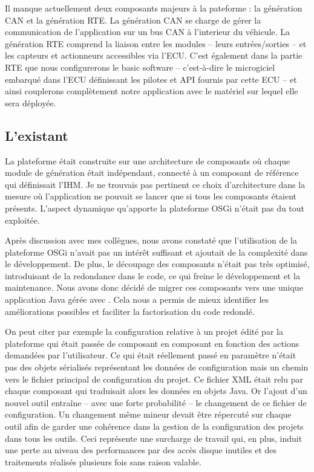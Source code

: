 Il manque actuellement deux composants majeurs à la pateforme : la génération
CAN et la génération RTE. La génération CAN se charge de gérer la communication
de l'application sur un bus CAN à l'interieur du véhicule. La génération RTE
comprend la liaison entre les modules -- leurs entrées/sorties -- et les
capteurs et actionneurs accessibles via l'ECU. C'est également dans la partie
RTE que nous configurerons le \og basic software \fg{} -- c'est-à-dire le
microgiciel embarqué dans l'ECU définissant les pilotes et API fournis par cette
ECU -- et ainsi couplerons complètement notre application avec le matériel sur
lequel elle sera déployée.

\subsection{L'existant}
La plateforme était construite sur une architecture de composants 
où chaque module de génération était indépendant, connecté à un composant de
référence qui définissait l'IHM. Je ne trouvais pas pertinent ce choix
d'architecture dans la mesure où l'application ne pouvait se lancer que si tous
les composants étaient présents. L'aspect dynamique qu'apporte la plateforme
OSGi n'était pas du tout exploitée.

Après discussion avec mes collègues, nous avons constaté que l'utilisation de la
plateforme OSGi n'avait pas un intérêt suffisant et ajoutait de la complexité
dans le développement. De plus, le découpage des composants n'était pas très
optimisé, introduisant de la redondance dans le code, ce qui freine le
développement et la maintenance. Nous avons donc décidé de migrer ces composants
vers une unique application Java gérée avec . Cela nous a permis de
mieux identifier les améliorations possibles et faciliter la factorisation du code redondé.

On peut citer par exemple la configuration relative à un projet édité par la
plateforme qui était passée de composant en composant en fonction des actions
demandées par l'utilisateur. Ce qui était réellement passé en paramètre n'était
pas des objets sérialisés représentant les données de configuration mais un
chemin vers le fichier principal de configuration du projet. Ce fichier XML
était relu par chaque composant qui traduisait alors les données en objets Java.
Or l'ajout d'un nouvel outil entraîne -- avec une forte probabilité -- le
changement de ce fichier de configuration. Un changement même mineur devait être
répercuté sur chaque outil afin de garder une cohérence dans la gestion de la
configuration des projets dans tous les outils. Ceci représente une surcharge de
travail qui, en plus, induit une perte au niveau des performances par des accès
disque inutiles et des traitements réalisés plusieurs fois sans raison valable.

